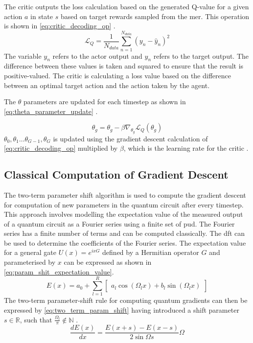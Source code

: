 The critic outputs the loss calculation based on the generated Q-value for a given action $a$ in state $s$ based on target rewards sampled from the \acrshort{mer}. 
This operation is shown in \ref{eq:critic_decoding_op} \cite{silvirianti_layerwise_2024}. 
\begin{equation} \label{eq:critic_decoding_op}
   \mathcal{L}_{Q} = \frac{1}{N_{data}} \sum_{n=1}^{N_{data}} (y_{n} - \hat{y}_{n})^2
\end{equation}
The variable $y_{n}$ refers to the actor output and $\hat{y}_{n}$ refers to the target output. 
The difference between these values is taken and squared to ensure that the result is positive-valued. 
The critic is calculating a loss value based on the difference between an optimal target action and the action taken by the agent. 

The $\theta$ parameters are updated for each timestep as shown in \ref{eq:theta_parameter_update} \cite{silvirianti_layerwise_2024}.  

\begin{equation} \label{eq:theta_parameter_update}
   \theta_{g} = \theta_{g} - \beta \nabla_{\theta_{g}} \mathcal{L}_{Q} (\theta_{g})
\end{equation}
$\theta_{0}, \theta_{1} \dots \theta_{G-1}, \theta_{G}$ is updated using the gradient descent calculation of \ref{eq:critic_decoding_op} multiplied by $\beta$, which is the learning rate for the critic \cite{silvirianti_layerwise_2024}. 
\subsection{Classical Computation of Gradient Descent}
The two-term parameter shift algorithm is used to compute the gradient descent for computation of new parameters in the quantum circuit after every timestep.  
This approach involves modelling the expectation value of the measured output of a quantum circuit as a Fourier series using a finite set of \acrfull{pud}.
The Fourier series has a finite number of terms and can be computed classically. 
The \acrfull{dft} can be used to determine the coefficients of the Fourier series. 
The expectation value for a general gate $U(x) = e^{ixG}$ defined by a Hermitian operator $G$ and parameterised by $x$ can be expressed as shown in \ref{eq:param_shit_expectation_value}. 
\begin{equation} \label{eq:param_shit_expectation_value}
    E(x) = a_{0} + \sum_{l=1}^{R} \begin{bmatrix}
        a_{l} \cos(\Omega_{l}x) + b_{l} \sin(\Omega_{l}x)
    \end{bmatrix}
\end{equation}
The two-term parameter-shift rule for computing quantum gradients can then be expressed by \ref{eq:two_term_param_shift} having introduced a shift parameter $s \in \mathbb{R}$, such that $\frac{\Omega_{l}}{\pi} \notin \mathbb{N}$ \cite{wierichs_general_2022}. 
\begin{equation} \label{eq:two_term_param_shift}
    \frac{dE(x)}{dx} = \frac{E(x+s) - E(x-s)}{2\sin{\Omega s}} \Omega
\end{equation}
